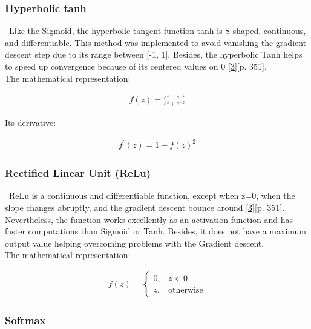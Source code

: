 \subsubsection{Hyperbolic tanh}
\label{chap:Hyperbolic tanh}

\quad \, Like the Sigmoid, the hyperbolic tangent function tanh is S-shaped, continuous, and differentiable. This method was implemented to avoid vanishing the gradient descent step due to its range between [-1, 1]. Besides, the hyperbolic Tanh helps to speed up convergence because of its centered values on 0 \hyperref[Bib:Hands-on Machine Learning]{[3]}[p. 351].\\

The mathematical representation:

\begin{align*}
f(z) = \frac{e^{z} - e^{-z}}{e^{z} + e^{-z}}
\end{align*}

Its derivative:

\begin{align*}
f^{'}(z) = 1 - f(z)^2
\end{align*}

\subsubsection{Rectified Linear Unit (ReLu)}
\label{chap:Rectified Linear Unit}

\quad \, ReLu is a continuous and differentiable function, except when z=0, when the slope changes abruptly, and the gradient descent bounce around \hyperref[Bib:Hands-on Machine Learning]{[3]}[p. 351]. Nevertheless, the function works excellently as an activation function and has faster computations than Sigmoid or Tanh. Besides, it does not have a maximum output value helping overcoming problems with the Gradient descent.\\

The mathematical representation:

\begin{align*}
f(z) = 
\begin{cases}
0,  &  z < 0\\
z,  & \text{otherwise}
\end{cases}
\end{align*}

\subsubsection{Softmax}
\label{chap:Softmax}

